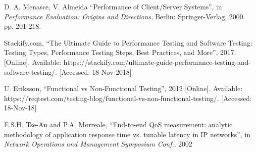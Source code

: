 \begin{thebibliography}{999}
	
	D. A. Menasce, V. Almeida
	``Performance of Client/Server Systems'',
	in \textit{Performance Evaluation: Origins and Directions},
	Berlin: Springer-Verlag, 2000.
	pp. 201-218.
	
	Stackify.com,
	``The Ultimate Guide to Performance Testing and Software Testing: Testing Types, Performance Testing Steps, Best Practices, and More'', 2017.
	[Online]. Available: https://stackify.com/ultimate-guide-performance-testing-and-software-testing/.
	[Accessed: 18-Nov-2018]
	
	U. Eriksson,
	``Functional vs Non-Functional Testing'', 2012
	[Online]. Available: https://reqtest.com/testing-blog/functional-vs-non-functional-testing/.
	[Accessed: 18-Nov-18]
	
	E.S.H. Tse-Au and P.A. Morreale,
	``End-to-end QoS measurement: analytic methodology of application response time vs. tunable latency in IP networks'',
	in \textit{Network Operations and Management Symposium Conf.}, 2002 
\end{thebibliography}